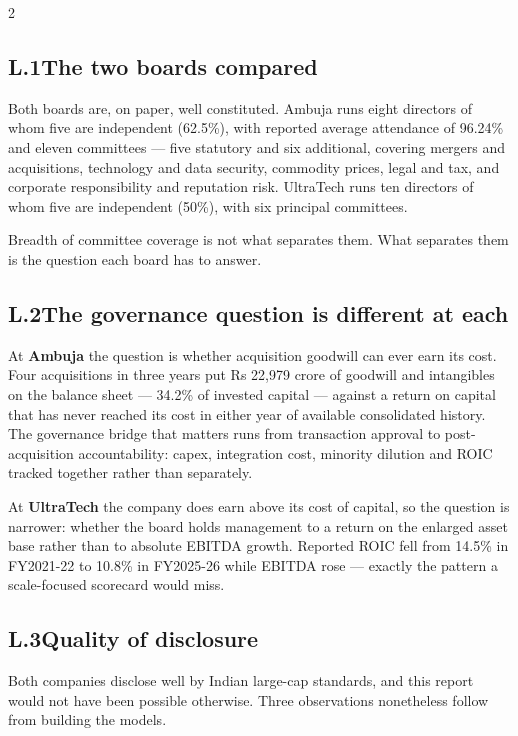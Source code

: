 \begin{paracol}{2}
\subsection*{L.1\quad The two boards compared}

Both boards are, on paper, well constituted. Ambuja runs eight directors of whom five
are independent (62.5\%), with reported average attendance of 96.24\% and eleven
committees — five statutory and six additional, covering mergers and acquisitions,
technology and data security, commodity prices, legal and tax, and corporate
responsibility and reputation risk. UltraTech runs ten directors of whom five are
independent (50\%), with six principal committees.

Breadth of committee coverage is not what separates them. What separates them is the
question each board has to answer.

\subsection*{L.2\quad The governance question is different at each}

At \textbf{Ambuja} the question is whether acquisition goodwill can ever earn its cost.
Four acquisitions in three years put Rs 22,979 crore of goodwill and intangibles on the
balance sheet — 34.2\% of invested capital — against a return on capital that has never
reached its cost in either year of available consolidated history. The governance
bridge that matters runs from transaction approval to post-acquisition accountability:
capex, integration cost, minority dilution and ROIC tracked together rather than
separately.

At \textbf{UltraTech} the company does earn above its cost of capital, so the question
is narrower: whether the board holds management to a return on the enlarged asset base
rather than to absolute EBITDA growth. Reported ROIC fell from 14.5\% in FY2021-22 to
10.8\% in FY2025-26 while EBITDA rose — exactly the pattern a scale-focused scorecard
would miss.

\subsection*{L.3\quad Quality of disclosure}

Both companies disclose well by Indian large-cap standards, and this report would not
have been possible otherwise. Three observations nonetheless follow from building the
models.


\end{paracol}
